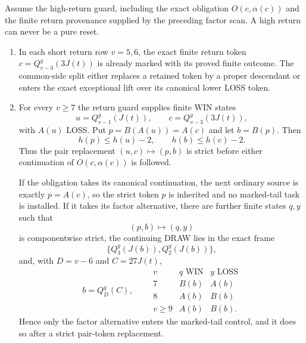 \begin{lemma}\label{lem:high-return-pay}
Assume the high-return guard, including the exact obligation
$O(c,\alpha(c))$ and the finite return provenance supplied by the preceding
factor scan. A high return can never be a pure reset.
\begin{enumerate}[label=(\alph*)]
\item In each short return row $v=5,6$, the exact finite return token
      $c=Q_{v-3}^g(3J(t))$ is already marked with its proved finite outcome.
      The common-side split either replaces a retained token by a proper
      descendant or enters the exact exceptional lift over its canonical
      lower LOSS token.
\item For every $v\ge7$ the return guard supplies finite WIN states
\[
 u=Q_{v-1}^g(J(t)),\qquad c=Q_{v-3}^g(3J(t)),
\]
with $A(u)$ LOSS. Put $p=B(A(u))=A(c)$ and let $b=B(p)$. Then
\[
 h(p)\le h(u)-2,\qquad h(b)\le h(c)-2.
\]
Thus the pair replacement $(u,c)\mapsto(p,b)$ is strict before either
continuation of $O(c,\alpha(c))$ is followed.

If the obligation takes its canonical continuation, the next ordinary
source is exactly $p=A(c)$, so the strict token $p$ is inherited and no
marked-tail task is installed. If it takes its factor alternative, there are
further finite states $q,y$ such that
\[
 (p,b)\longmapsto(q,y)
\]
is componentwise strict, the continuing DRAW lies in the exact frame
\[
 \{Q_3^g(J(b)),Q_2^g(J(b))\},
\]
and, with $D=v-6$ and $C=27J(t)$,
\[
 b=Q_D^g(C),\qquad
\begin{array}{c|cc}
 v&q\text{ WIN}&y\text{ LOSS}\\ \hline
 7&B(b)&A(b)\\
 8&A(b)&B(b)\\
 v\ge9&A(b)&B(b).
\end{array}
\]
Hence only the factor alternative enters the marked-tail control, and it
does so after a strict pair-token replacement.
\end{enumerate}
\end{lemma}

